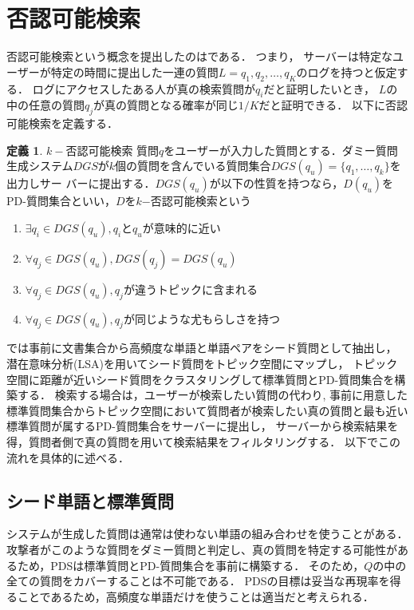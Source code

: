 \documentclass[master]{suribt}
\theoremstyle{definition}
\newtheorem{defi}[thm]{定義}
\begin{document}
 \section{否認可能検索}\label{s:PDS}
 否認可能検索という概念を提出したのは\cite{}である．
 つまり， サーバーは特定なユーザーが特定の時間に提出した一連の質問$L = {q_1, q_2, \dots , q_K}$のログを持つと仮定する． 
 ログにアクセスしたある人が真の検索質問が$q_i$だと証明したいとき， $L$の中の任意の質問$q_j$が真の質問となる確率が同じ$1/K$だと証明できる．
 以下に否認可能検索を定義する．
 \begin{defi}{$k−$否認可能検索}
 	質問$q$をユーザーが入力した質問とする．ダミー質問生成システム$DGS$が$k$個の質問を含んでいる質問集合$DGS(q_u)=\{q_1, \dots , q_k\}$を出力しサー
	バーに提出する．$DGS(q_u)$が以下の性質を持つなら，$D(q_u)$をPD-質問集合といい，$D$を$k$−否認可能検索という
	\begin{enumerate}
	\item $\exists q_i \in DGS(q_u),q_i$と$q_u$が意味的に近い
	\item $\forall q_j \in DGS(q_u),DGS(q_j) = DGS(q_u)$
	\item $\forall q_j \in DGS(q_u),q_j$が違うトピックに含まれる
	\item $\forall q_j \in DGS(q_u),q_j$が同じような尤もらしさを持つ
	\end{enumerate}
  \end{defi}
 \cite{providing2009}では事前に文書集合から高頻度な単語と単語ペアをシード質問として抽出し，
 潜在意味分析(LSA)\cite{}を用いてシード質問をトピック空間にマップし，
 トピック空間に距離が近いシード質問をクラスタリングして標準質問とPD-質問集合を構築する．
 検索する場合は，ユーザーが検索したい質問の代わり,
 事前に用意した標準質問集合からトピック空間において質問者が検索したい真の質問と最も近い標準質問が属するPD-質問集合をサーバーに提出し，
 サーバーから検索結果を得，質問者側で真の質問を用いて検索結果をフィルタリングする．
 以下でこの流れを具体的に述べる．
 \subsection{シード単語と標準質問}
 システムが生成した質問は通常は使わない単語の組み合わせを使うことがある．
 攻撃者がこのような質問をダミー質問と判定し、真の質問を特定する可能性があるため，PDSは標準質問とPD-質問集合を事前に構築する．
 そのため，$Q$の中の全ての質問をカバーすることは不可能である．
 PDSの目標は妥当な再現率を得ることであるため，高頻度な単語だけを使うことは適当だと考えられる．
 
\end{document}
